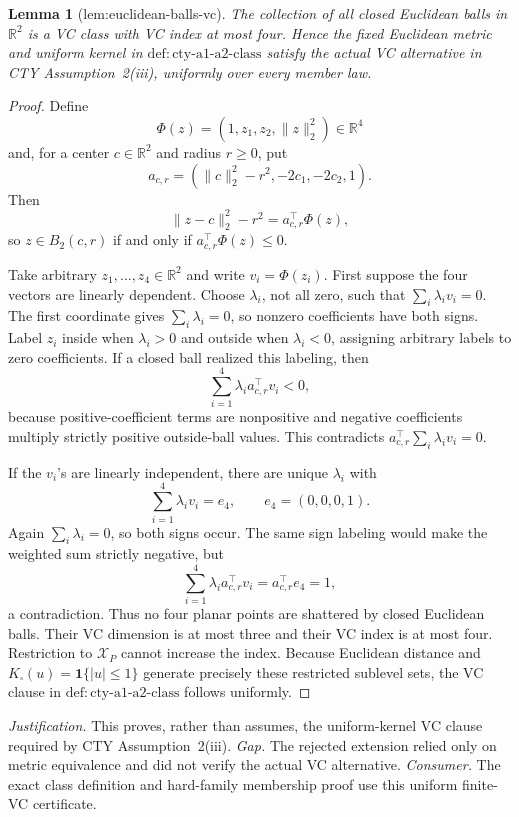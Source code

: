 \documentclass{article}
\newtheorem{lemma}{Lemma}
\begin{document}
\begin{lemma}[lem:euclidean-balls-vc]\label{lem:euclidean-balls-vc}
The collection of all closed Euclidean balls in \(\mathbb R^2\) is a VC class with VC index at most four.  Hence the fixed Euclidean metric and uniform kernel in \(\mathrm{def:cty\text{-}a1\text{-}a2\text{-}class}\) satisfy the actual VC alternative in CTY Assumption~2(iii), uniformly over every member law.
\end{lemma}
\begin{proof}
Define
\[
 \Phi(z)=(1,z_1,z_2,\lVert z\rVert_2^2)\in\mathbb R^4
\]
and, for a center \(c\in\mathbb R^2\) and radius \(r\geq0\), put
\[
 a_{c,r}=(\lVert c\rVert_2^2-r^2,-2c_1,-2c_2,1).
\]
Then
\[
 \lVert z-c\rVert_2^2-r^2=a_{c,r}^{\top}\Phi(z),
\]
so \(z\in B_2(c,r)\) if and only if \(a_{c,r}^{\top}\Phi(z)\leq0\).

Take arbitrary \(z_1,\ldots,z_4\in\mathbb R^2\) and write \(v_i=\Phi(z_i)\).  First suppose the four vectors are linearly dependent.  Choose \(\lambda_i\), not all zero, such that \(\sum_i\lambda_iv_i=0\).  The first coordinate gives \(\sum_i\lambda_i=0\), so nonzero coefficients have both signs.  Label \(z_i\) inside when \(\lambda_i>0\) and outside when \(\lambda_i<0\), assigning arbitrary labels to zero coefficients.  If a closed ball realized this labeling, then
\[
 \sum_{i=1}^4\lambda_i a_{c,r}^{\top}v_i<0,
\]
because positive-coefficient terms are nonpositive and negative coefficients multiply strictly positive outside-ball values.  This contradicts \(a_{c,r}^{\top}\sum_i\lambda_iv_i=0\).

If the \(v_i\)'s are linearly independent, there are unique \(\lambda_i\) with
\[
 \sum_{i=1}^4\lambda_iv_i=e_4,
 \qquad e_4=(0,0,0,1).
\]
Again \(\sum_i\lambda_i=0\), so both signs occur.  The same sign labeling would make the weighted sum strictly negative, but
\[
 \sum_{i=1}^4\lambda_i a_{c,r}^{\top}v_i
 =a_{c,r}^{\top}e_4=1,
\]
a contradiction.  Thus no four planar points are shattered by closed Euclidean balls.  Their VC dimension is at most three and their VC index is at most four.  Restriction to \(\mathcal X_P\) cannot increase the index.  Because Euclidean distance and \(K_\square(u)=\mathbf1\{|u|\leq1\}\) generate precisely these restricted sublevel sets, the VC clause in \(\mathrm{def:cty\text{-}a1\text{-}a2\text{-}class}\) follows uniformly.
\end{proof}
\par\smallskip\noindent \textit{Justification.} This proves, rather than assumes, the uniform-kernel VC clause required by CTY Assumption~2(iii). \textit{Gap.} The rejected extension relied only on metric equivalence and did not verify the actual VC alternative. \textit{Consumer.} The exact class definition and hard-family membership proof use this uniform finite-VC certificate.
\end{document}
